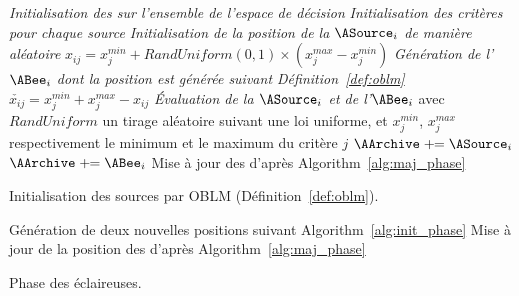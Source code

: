 \begin{algorithm}\label{alg:init_phase}
  \SetAlgoVlined
  \DontPrintSemicolon
  \emph{Initialisation des \ASources sur l’ensemble de l’espace de décision}\;
  {
    \emph{Initialisation des critères pour chaque source}\;
    {
       \emph{Initialisation de la position de la $\ASource_{i}$ de manière aléatoire}\;
      \Indp
      $x_{ij} = x_{j}^{min} + RandUniform(0, 1) \times (x_{j}^{max} - x_{j}^{min})$\;
      \Indm
      \BlankLine
        \emph{Génération de l’$\ABee_{i}$ dont la position est générée suivant Définition~\ref{def:oblm}}\;
      \Indp
      $ \check{x_{ij}} = x_{j}^{min} + x_{j}^{max} - x_{ij}$\;
      \Indm
      \BlankLine
       \emph{Évaluation de la $\ASource_{i}$ et de l’$\ABee_{i}$}\;
      \BlankLine
      avec $RandUniform$ un tirage aléatoire suivant une loi uniforme, et $x_{j}^{min}$, $x_{j}^{max}$
      respectivement le minimum et le maximum du critère $j$\;
    }
    {
      $\AArchive \pluseq \ASource_{i}$ 
    }
    {
      $\AArchive \pluseq \ABee_{i}$ 
    }
  }
  Mise à jour des \ASources d’après Algorithm~\ref{alg:maj_phase}\;
  \caption{Initialisation des sources par OBLM (Définition~\ref{def:oblm}).}
\end{algorithm}

\begin{algorithm}\label{alg:scout_phase}
  \SetAlgoVlined
  \DontPrintSemicolon
  {
    {
      Génération de deux nouvelles positions suivant Algorithm~\ref{alg:init_phase}\;
    }
  }
  Mise à jour de la position des \ASources d’après Algorithm~\ref{alg:maj_phase}\;
  \caption{Phase des éclaireuses.}
\end{algorithm}


